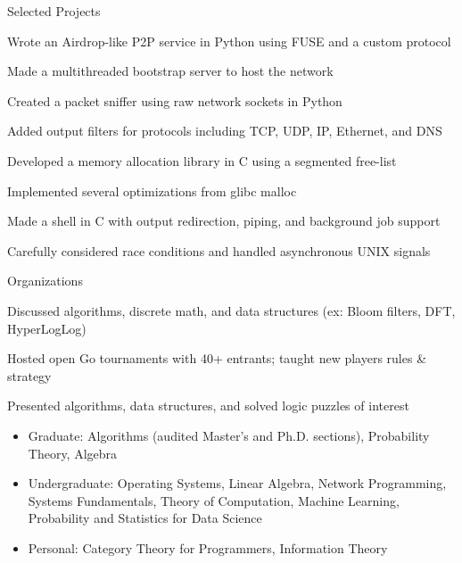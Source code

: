 \documentclass{cv}
\begin{document}
\begin{cvsection}{Selected Projects}
  {
    \item Wrote an Airdrop-like P2P service in Python using FUSE and a custom protocol
    \item Made a multithreaded bootstrap server to host the network
  }
  {
    \item Created a packet sniffer using raw network sockets in Python
    \item Added output filters for protocols including TCP, UDP, IP, Ethernet, and DNS
  }
  {
    \item Developed a memory allocation library in C using a segmented free-list
    \item Implemented several optimizations from glibc malloc
  }
  {
    \item Made a shell in C with output redirection, piping, and background job support
    \item Carefully considered race conditions and handled asynchronous UNIX signals
  }
\end{cvsection}

\begin{cvsection}{Organizations}
  {
    \item Discussed algorithms, discrete math, and data structures (ex: Bloom filters, DFT, HyperLogLog)
  }
  {
    \item Hosted open Go tournaments with 40+ entrants; taught new players rules \& strategy
  }
  {
    \item Presented algorithms, data structures, and solved logic puzzles of interest
  }
\end{cvsection}

\begin{minipage}{\textwidth}
  \begin{itemize}[noitemsep,topsep=0pt]%
    \item Graduate: Algorithms (audited Master's and Ph.D. sections), Probability Theory, Algebra
    \item Undergraduate: Operating Systems, Linear Algebra, Network Programming, Systems Fundamentals, Theory of Computation, Machine Learning, Probability and Statistics for Data Science
    \item Personal: Category Theory for Programmers, Information Theory
  \end{itemize}%
\end{minipage}%
\end{document}
